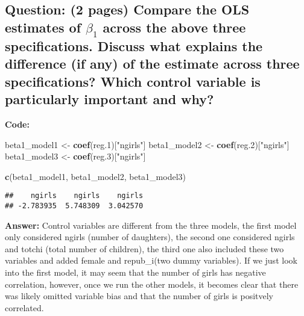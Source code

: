 \documentclass[
]{article}
\newenvironment{Shaded}{\begin{snugshade}}{\end{snugshade}}
\newcommand{\FloatTok}[1]{\textcolor[rgb]{0.00,0.00,0.81}{#1}}
\newcommand{\FunctionTok}[1]{\textcolor[rgb]{0.13,0.29,0.53}{\textbf{#1}}}
\newcommand{\NormalTok}[1]{#1}
\newcommand{\OtherTok}[1]{\textcolor[rgb]{0.56,0.35,0.01}{#1}}
\newcommand{\StringTok}[1]{\textcolor[rgb]{0.31,0.60,0.02}{#1}}
\begin{document}
\clearpage

\hypertarget{question-2-pages-compare-the-ols-estimates-of-beta_1-across-the-above-three-specifications.-discuss-what-explains-the-difference-if-any-of-the-estimate-across-three-specifications-which-control-variable-is-particularly-important-and-why}{%
\subsection{\texorpdfstring{Question: (2 pages) Compare the OLS
estimates of \(\beta_1\) across the above three specifications. Discuss
what explains the difference (if any) of the estimate across three
specifications? Which control variable is particularly important and
why?}{Question: (2 pages) Compare the OLS estimates of \textbackslash beta\_1 across the above three specifications. Discuss what explains the difference (if any) of the estimate across three specifications? Which control variable is particularly important and why?}}\label{question-2-pages-compare-the-ols-estimates-of-beta_1-across-the-above-three-specifications.-discuss-what-explains-the-difference-if-any-of-the-estimate-across-three-specifications-which-control-variable-is-particularly-important-and-why}}

\textbf{Code:}

\begin{Shaded}
\begin{Highlighting}[]
\NormalTok{beta1\_model1 }\OtherTok{\textless{}{-}} \FunctionTok{coef}\NormalTok{(reg}\FloatTok{.1}\NormalTok{)[}\StringTok{"ngirls"}\NormalTok{]}
\NormalTok{beta1\_model2 }\OtherTok{\textless{}{-}} \FunctionTok{coef}\NormalTok{(reg}\FloatTok{.2}\NormalTok{)[}\StringTok{"ngirls"}\NormalTok{]}
\NormalTok{beta1\_model3 }\OtherTok{\textless{}{-}} \FunctionTok{coef}\NormalTok{(reg}\FloatTok{.3}\NormalTok{)[}\StringTok{"ngirls"}\NormalTok{]}

\FunctionTok{c}\NormalTok{(beta1\_model1, beta1\_model2, beta1\_model3)}
\end{Highlighting}
\end{Shaded}

\begin{verbatim}
##    ngirls    ngirls    ngirls 
## -2.783935  5.748309  3.042570
\end{verbatim}

\textbf{Answer:} Control variables are different from the three models,
the first model only considered ngirls (number of daughters), the second
one considered ngirls and totchi (total number of children), the third
one also included these two variables and added female and repub\_i(two
dummy variables). If we just look into the first model, it may seem that
the number of girls has negative correlation, however, once we run the
other models, it becomes clear that there was likely omitted variable
bias and that the number of girls is positvely correlated.
\end{document}

